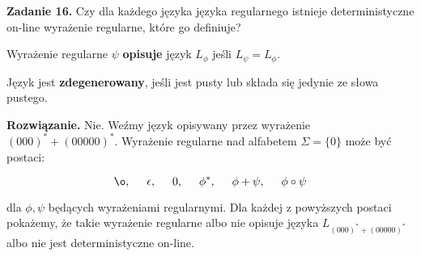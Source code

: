 \documentclass[a4paper]{article}
\begin{document}
\setlength{\parindent}{0pt}

\textbf{Zadanie 16.} Czy dla każdego języka języka regularnego istnieje deterministyczne on-line wyrażenie regularne, które go definiuje?
\vspace{1cm}

Wyrażenie regularne $\psi$ \textbf{opisuje} język $L_{\phi}$ jeśli $L_{\psi} = L_{\phi}$.

Język jest \textbf{zdegenerowany}, jeśli jest pusty lub składa się jedynie ze słowa pustego.
\vspace{1cm}

\textbf{Rozwiązanie.} Nie. Weźmy język opisywany przez wyrażenie $(000)^* + (00000)^*$. Wyrażenie regularne nad alfabetem $\Sigma = \{ 0 \}$ może być postaci:

$$ \o,\hspace{5mm} \epsilon,\hspace{5mm} 0,\hspace{5mm} \phi^*,\hspace{5mm} \phi + \psi,\hspace{5mm} \phi \circ \psi$$

dla $\phi, \psi$ będących wyrażeniami regularnymi. Dla każdej z powyższych postaci pokażemy, że takie wyrażenie regularne albo nie opisuje języka $L_{(000)^* + (00000)^*}$ albo nie jest deterministyczne on-line.
\end{document}
